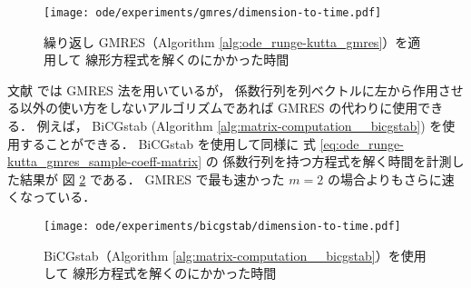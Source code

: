 \begin{figure}[tp]
    \centering
    \texttt{[image: ode/experiments/gmres/dimension-to-time.pdf]}
    \caption{繰り返し GMRES（Algorithm \ref{alg:ode_runge-kutta_gmres}）を適用して%
        線形方程式を解くのにかかった時間}
    \label{fig:ode_runge-kutta_gmres_subspace-dimension-to-processing-time}
\end{figure}

文献 \cite{Blom2016, Blom2013} では GMRES 法を用いているが，
係数行列を列ベクトルに左から作用させる以外の使い方をしないアルゴリズムであれば
GMRES の代わりに使用できる．
例えば，
BiCGstab (Algorithm \ref{alg:matrix-computation__bicgstab})
を使用することができる．
BiCGstab を使用して同様に
式 \eqref{eq:ode_runge-kutta_gmres_sample-coeff-matrix} の
係数行列を持つ方程式を解く時間を計測した結果が
図 \ref{fig:ode_runge-kutta_bicgstab_subspace-dimension-to-processing-time} である．
GMRES で最も速かった $m=2$ の場合よりもさらに速くなっている．

\begin{figure}[tp]
    \centering
    \texttt{[image: ode/experiments/bicgstab/dimension-to-time.pdf]}
    \caption{BiCGstab（Algorithm \ref{alg:matrix-computation__bicgstab}）を使用して%
        線形方程式を解くのにかかった時間}
    \label{fig:ode_runge-kutta_bicgstab_subspace-dimension-to-processing-time}
\end{figure}

\clearpage
